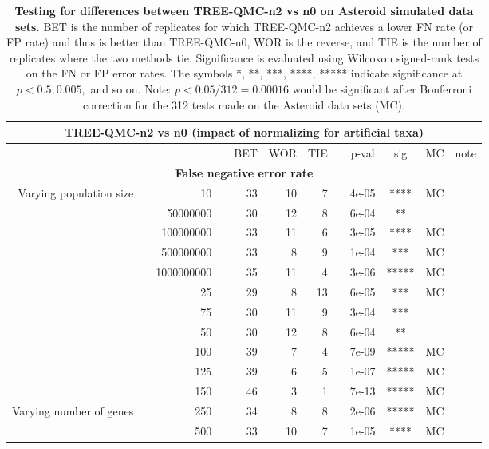\begin{table}[!h]
\caption[Statistical testing for TREE-QMC-n2 vs n0 on Asteroid data]{
\textbf{Testing for differences between TREE-QMC-n2 vs n0 on Asteroid simulated data sets.}
BET is the number of replicates for which TREE-QMC-n2 achieves a lower FN rate (or FP rate) and thus is better than TREE-QMC-n0, WOR is the reverse, and TIE is the number of replicates where the two methods tie.
Significance is evaluated using Wilcoxon signed-rank tests on the FN or FP error rates.
The symbols *, **, ***, ****, ***** indicate significance at $p < 0.5, 0.005,$ and so on.
Note: $p < 0.05 / 312 = 0.00016$ would be significant after Bonferroni correction for the 312 tests made on the Asteroid data sets (MC).}
\centering
\scriptsize
\begin{tabular}{r r r l r r r l c c c l}
\toprule 
\multicolumn{12}{c}{\textbf{TREE-QMC-n2 vs n0 (impact of normalizing for artificial taxa)}} \\
\midrule
\multirow{ 1}{2cm}{}
& & & & BET & WOR & TIE & & p-val & sig & MC & note \\
\midrule
\multicolumn{12}{c}{\textbf{False negative error rate}} \\
\midrule
\multirow{ 6}{2cm}{Varying population size}
 & & 10 & & 33 & 10 & 7 & & 4e-05 & **** & MC &  \\
   & & 50000000 & & 30 & 12 & 8 & & 6e-04 & ** &  &  \\
   & & 100000000 & & 33 & 11 & 6 & & 3e-05 & **** & MC &  \\
   & & 500000000 & & 33 & 8 & 9 & & 1e-04 & *** & MC &  \\
   & & 1000000000 & & 35 & 11 & 4 & & 3e-06 & ***** & MC &  \\
\midrule
\multirow{ 6}{2cm}{Varying number of taxa}
   & & 25 & & 29 & 8 & 13 & & 6e-05 & *** & MC &  \\
   & & 75 & & 30 & 11 & 9 & & 3e-04 & *** &  &  \\
   & & 50 & & 30 & 12 & 8 & & 6e-04 & ** &  &  \\
   & & 100 & & 39 & 7 & 4 & & 7e-09 & ***** & MC &  \\
   & & 125 & & 39 & 6 & 5 & & 1e-07 & ***** & MC &  \\
   & & 150 & & 46 & 3 & 1 & & 7e-13 & ***** & MC &  \\
\midrule
\multirow{ 4}{2cm}{Varying number of genes}
   & & 250 & & 34 & 8 & 8 & & 2e-06 & ***** & MC &  \\
   & & 500 & & 33 & 10 & 7 & & 1e-05 & **** & MC &  \\

\end{tabular}
\end{table}
